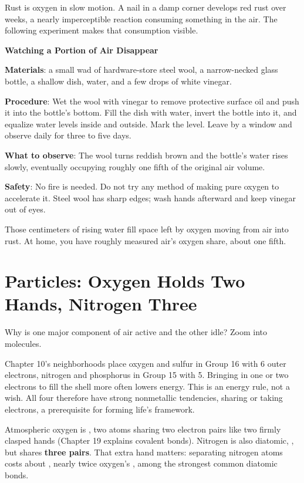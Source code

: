 Rust is oxygen in slow motion. A nail in a damp corner develops red rust over weeks, a nearly imperceptible reaction consuming something in the air. The following experiment makes that consumption visible.

\begin{shiyan}
\textbf{Watching a Portion of Air Disappear}

\textbf{Materials}: a small wad of hardware-store steel wool, a narrow-necked glass bottle, a shallow dish, water, and a few drops of white vinegar.

\textbf{Procedure}: Wet the wool with vinegar to remove protective surface oil and push it into the bottle's bottom. Fill the dish with water, invert the bottle into it, and equalize water levels inside and outside. Mark the level. Leave by a window and observe daily for three to five days.

\textbf{What to observe}: The wool turns reddish brown and the bottle's water rises slowly, eventually occupying roughly one fifth of the original air volume.

\textbf{Safety}: No fire is needed. Do not try any method of making pure oxygen to accelerate it. Steel wool has sharp edges; wash hands afterward and keep vinegar out of eyes.

Those centimeters of rising water fill space left by oxygen moving from air into rust. At home, you have roughly measured air's oxygen share, about one fifth.
\end{shiyan}

\section{Particles: Oxygen Holds Two Hands, Nitrogen Three}

Why is one major component of air active and the other idle? Zoom into molecules.

Chapter 10's neighborhoods place oxygen and sulfur in Group 16 with 6 outer electrons, nitrogen and phosphorus in Group 15 with 5. Bringing in one or two electrons to fill the shell more often lowers energy. This is an energy rule, not a wish. All four therefore have strong nonmetallic tendencies, sharing or taking electrons, a prerequisite for forming life's framework.

Atmospheric oxygen is , two atoms sharing two electron pairs like two firmly clasped hands (Chapter 19 explains covalent bonds). Nitrogen is also diatomic, , but shares \textbf{three pairs}. That extra hand matters: separating nitrogen atoms costs about , nearly twice oxygen's , among the strongest common diatomic bonds.

